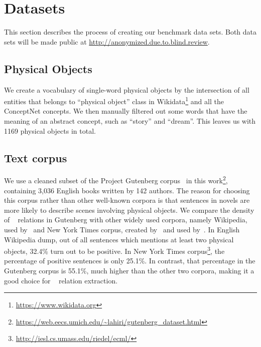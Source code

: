 \section{Datasets}
\label{sec:data}

This section describes the process of creating our benchmark data sets.
Both data sets will be made public at 
\url{http://anonymized.due.to.blind.review}.

\subsection{Physical Objects}
We create a vocabulary of single-word physical objects by the 
intersection of all entities that belongs to ``physical object'' class
in Wikidata\footnote{\url{https://www.wikidata.org}} and 
all the ConceptNet concepts. We then manually filtered out some 
words that have the meaning of an abstract concept, 
such as ``story'' and ``dream''. This leaves us with
1169 physical objects in total.

\subsection{Text corpus}
We use a cleaned subset of the Project Gutenberg corpus~\cite{lahiri:2014:SRW} 
in this work\footnote{\url{https://web.eecs.umich.edu/~lahiri/gutenberg_dataset.html}}, containing 3,036 English books written by 142 authors.
The reason for choosing this corpus rather than other well-known
corpora is that sentences in novels are more likely to describe scenes 
involving physical objects. 
We compare the density of \lnear~ relations in Gutenberg with other 
widely used corpora, namely Wikipedia, 
used by~\citeauthor{mintz2009distant} and New York Times corpus, 
created by~\citeauthor{riedel2010modeling} and 
used by~\citeauthor{Lin2016NeuralRE,hoffmann2011knowledge,surdeanu2012multi}. 
In English Wikipedia dump, out of all sentences which mentions at least two
physical objects, 32.4\% turn out to be positive. 
In New York Times corpus\footnote{\url{http://iesl.cs.umass.edu/riedel/ecml/}},
the percentage of positive sentences is only 25.1\%. 
In contrast, that percentage in the Gutenberg corpus is 55.1\%, much higher 
than the other two corpora, making it a good choice for \lnear~ 
relation extraction.

